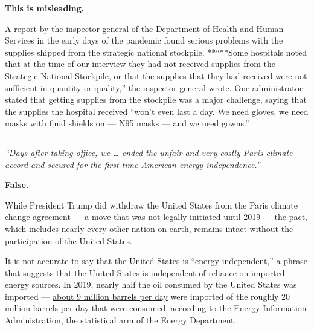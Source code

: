 \textbf{This is misleading.}

A
\href{https://slack-redir.net/link?url=https\%3A\%2F\%2Foig.hhs.gov\%2Foei\%2Freports\%2Foei-06-20-00300.pdf}{report
by the inspector general} of the Department of Health and Human Services
in the early days of the pandemic found serious problems with the
supplies shipped from the strategic national stockpile. **``**Some
hospitals noted that at the time of our interview they had not received
supplies from the Strategic National Stockpile, or that the supplies
that they had received were not sufficient in quantity or quality,'' the
inspector general wrote. One administrator stated that getting supplies
from the stockpile was a major challenge, saying that the supplies the
hospital received ``won't even last a day. We need gloves, we need masks
with fluid shields on --- N95 masks --- and we need gowns.''

\begin{center}\rule{0.5\linewidth}{\linethickness}\end{center}

\href{https://www.nytimes3xbfgragh.onion/live/2020/08/27/us/rnc-fact-check\#days-after-taking-office-we-ended-the-unfair-and-very-costly-paris-climate-accord-and-secured-for-the-first-time-american-energy}{\emph{``Days
after taking office, we \ldots{} ended the unfair and very costly Paris
climate accord and secured for the first time American energy
independence.''}}

\textbf{False.}

While President Trump did withdraw the United States from the Paris
climate change agreement ---
\href{https://www.nytimes3xbfgragh.onion/2019/10/23/climate/trump-paris-climate-accord.html}{a
move that was not legally initiated until 2019} --- the pact, which
includes nearly every other nation on earth, remains intact without the
participation of the United States.

It is not accurate to say that the United States is ``energy
independent,'' a phrase that suggests that the United States is
independent of reliance on imported energy sources. In 2019, nearly half
the oil consumed by the United States was imported ---
\href{https://www.eia.gov/tools/faqs/faq.php?id=727\&t=6\#:~:text=In\%202019\%2C\%20the\%20United\%20States,(including\%20ethanol\%20and\%20biodiesel).}{about
9 million barrels per day} were imported of the roughly 20 million
barrels per day that were consumed, according to the Energy Information
Administration, the statistical arm of the Energy Department.

